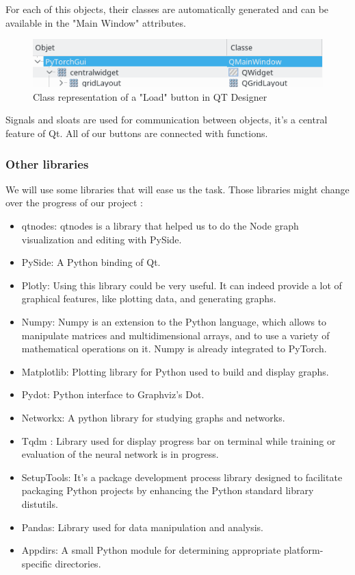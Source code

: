 For each of this objects, their classes are automatically generated and can be available in the "Main Window" attributes.  

\begin{figure}[h!]
    \centering 
    \includegraphics[scale=0.5]{figures/loadqt.png}
    \caption{Class representation of a "Load" button in QT Designer}
  \end{figure}
  
Signals and sloats are used for communication between objects, it's a central feature of Qt. All of our buttons are connected with functions. 

\subsubsection{Other libraries}
We will use some libraries that will ease us the task. Those libraries might change over the progress of our project :
\begin{itemize}
    \item qtnodes: qtnodes is a library that helped us to do the Node graph visualization and editing with PySide.
    \item PySide: A Python binding of Qt.
    \item Plotly: Using this library could be very useful. It can indeed provide a lot of graphical features, like plotting data, and generating graphs.
    \item Numpy: Numpy is an extension to the Python language, which allows to manipulate matrices and multidimensional arrays, and to use a variety of mathematical operations on it. Numpy is already integrated to PyTorch.
    \item Matplotlib: Plotting library for Python used to build and display graphs.
    \item Pydot: Python interface to Graphviz's Dot.
    \item Networkx: A python library for studying graphs and networks.
    \item Tqdm : Library used for display progress bar on terminal while training or evaluation of the neural network is in progress.
    \item SetupTools: It's a package development process library designed to facilitate packaging Python projects by enhancing the Python standard library distutils.
    \item Pandas: Library used for data manipulation and analysis.
    \item Appdirs: A small Python module for determining appropriate platform-specific directories.
\end{itemize}

